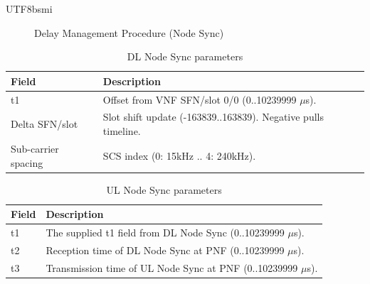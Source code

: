 \documentclass[conference]{IEEEtran}
\begin{document}
\begin{CJK}{UTF8}{bsmi}
\begin{figure}[htbp]
\caption{Delay Management Procedure (Node Sync)}
\label{fig:latency_probe}
\end{figure}

\begin{table}[htbp]
\caption{DL Node Sync parameters}
\label{tab:dl_node_sync}
\begin{center}
\begin{tabularx}{\columnwidth}{l|X}
\toprule
\textbf{Field} & \textbf{Description} \\ \midrule
t1 & Offset from VNF SFN/slot 0/0 (0..10239999 $\mu$s). \\ \midrule
Delta SFN/slot & Slot shift update (-163839..163839). Negative pulls timeline. \\ \midrule
Sub-carrier spacing & SCS index (0: 15kHz .. 4: 240kHz). \\ \bottomrule
\end{tabularx}
\end{center}
\end{table}

\begin{table}[htbp]
\caption{UL Node Sync parameters}
\label{tab:ul_node_sync}
\begin{center}
\begin{tabularx}{\columnwidth}{l|X}
\toprule
\textbf{Field} & \textbf{Description} \\ \midrule
t1 & The supplied t1 field from DL Node Sync (0..10239999 $\mu$s). \\ \midrule
t2 & Reception time of DL Node Sync at PNF (0..10239999 $\mu$s). \\ \midrule
t3 & Transmission time of UL Node Sync at PNF (0..10239999 $\mu$s). \\ \bottomrule
\end{tabularx}
\end{center}
\end{table}




\end{CJK}
\end{document}
